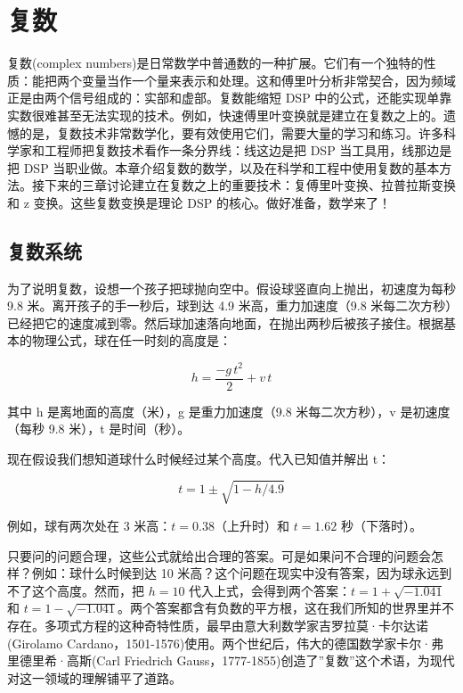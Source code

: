 
\chapter{复数}\label{ch-30}

复数(complex
numbers)是日常数学中普通数的一种扩展。它们有一个独特的性质：能把两个变量当作一个量来表示和处理。这和傅里叶分析非常契合，因为频域正是由两个信号组成的：实部和虚部。复数能缩短
DSP
中的公式，还能实现单靠实数很难甚至无法实现的技术。例如，快速傅里叶变换就是建立在复数之上的。遗憾的是，复数技术非常数学化，要有效使用它们，需要大量的学习和练习。许多科学家和工程师把复数技术看作一条分界线：线这边是把
DSP 当工具用，线那边是把 DSP
当职业做。本章介绍复数的数学，以及在科学和工程中使用复数的基本方法。接下来的三章讨论建立在复数之上的重要技术：复傅里叶变换、拉普拉斯变换和
z 变换。这些复数变换是理论 DSP 的核心。做好准备，数学来了！

\section{复数系统}

为了说明复数，设想一个孩子把球抛向空中。假设球竖直向上抛出，初速度为每秒
9.8 米。离开孩子的手一秒后，球到达 4.9 米高，重力加速度（9.8
米每二次方秒）已经把它的速度减到零。然后球加速落向地面，在抛出两秒后被孩子接住。根据基本的物理公式，球在任一时刻的高度是：

\[h = \frac{-g\,t^2}{2} + v\,t\]

其中 h 是离地面的高度（米），g 是重力加速度（9.8 米每二次方秒），v
是初速度（每秒 9.8 米），t 是时间（秒）。

现在假设我们想知道球什么时候经过某个高度。代入已知值并解出 t：

\[t = 1 \pm \sqrt{1 - h/4.9}\]

例如，球有两次处在 3 米高：\(t = 0.38\)（上升时）和 \(t = 1.62\)
秒（下落时）。

只要问的问题合理，这些公式就给出合理的答案。可是如果问不合理的问题会怎样？例如：球什么时候到达
10 米高？这个问题在现实中没有答案，因为球永远到不了这个高度。然而，把
\(h = 10\) 代入上式，会得到两个答案：\(t = 1 + \sqrt{-1.041}\) 和
\(t = 1 - \sqrt{-1.041}\)。两个答案都含有负数的平方根，这在我们所知的世界里并不存在。多项式方程的这种奇特性质，最早由意大利数学家吉罗拉莫·卡尔达诺(Girolamo
Cardano，1501-1576)使用。两个世纪后，伟大的德国数学家卡尔·弗里德里希·高斯(Carl
Friedrich
Gauss，1777-1855)创造了''复数''这个术语，为现代对这一领域的理解铺平了道路。

